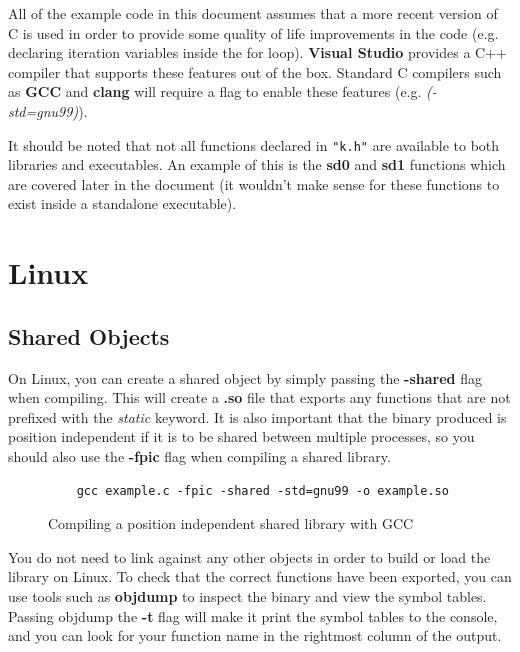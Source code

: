 All of the example code in this document assumes that a more recent version of C is used in order to provide
some quality of life improvements in the code (e.g. declaring iteration variables inside the for loop). \textbf{Visual Studio} provides a C++ compiler that supports these features out of the box. Standard C
compilers such as \textbf{GCC} and \textbf{clang} will require a flag to enable these features 
(e.g. \textit{(-std=gnu99)}).

It should be noted that not all functions declared in \verb|"k.h"| are available to both libraries and
executables. An example of this is the \textbf{sd0} and \textbf{sd1} functions which are covered later
in the document (it wouldn't make sense for these functions to exist inside a standalone executable).

\section{Linux}

\subsection{Shared Objects}

On Linux, you can create a shared object by simply passing the \textbf{-shared} flag when compiling. This
will create a \textbf{.so} file that exports any functions that are not prefixed with the \textit{static}
keyword. It is also important that the binary produced is position independent if it is to be shared between
multiple processes, so you should also use the \textbf{-fpic} flag when compiling a shared library.

\begin{figure}[h]
	\begin{lstlisting}
	gcc example.c -fpic -shared -std=gnu99 -o example.so
	\end{lstlisting}
	\caption{Compiling a position independent shared library with GCC}
\end{figure}

You do not need to link against any other objects in order to build or load the library on Linux. To check
that the correct functions have been exported, you can use tools such as \textbf{objdump} to inspect the binary
and view the symbol tables. Passing objdump the \textbf{-t} flag will make it print the symbol tables to the console, and you can look for your function name in the rightmost column of the output.

